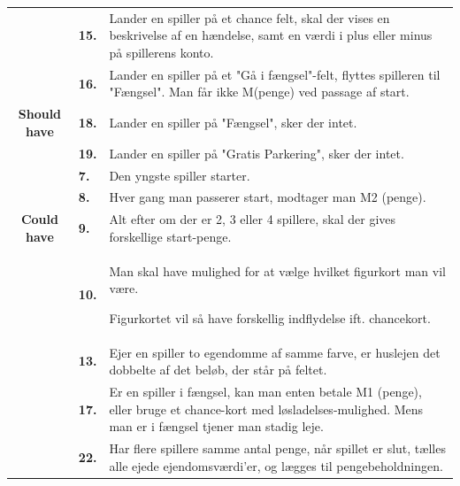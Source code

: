 \begin{center}
\begin{tabular}{ || c | l | p{11.5cm} ||}
     \cline{2-3}
     &
     \textbf{15.}
     &
     Lander en spiller på et chance felt, skal der vises en beskrivelse af en hændelse, samt en værdi i plus eller minus på spillerens konto.
     \\

     \cline{2-3}
     &
     \textbf{16.}
     &
     Lander en spiller på et "Gå i fængsel"-felt, flyttes spilleren til "Fængsel". Man får ikke M(penge) ved passage af start.
     \\
    
     \cline{2-3}
     \textbf{Should have}
     &
     \textbf{18.}
     &
     Lander en spiller på "Fængsel", sker der intet. \\
    
     \cline{2-3}
     &
     \textbf{19.}
     &
     Lander en spiller på "Gratis Parkering", sker der intet. 
     \\

     \hline
     \hline
     &
     \textbf{7.}
     &
     Den yngste spiller starter.
     \\

     \cline{2-3}
     &
     \textbf{8.}
     &
     Hver gang man passerer start, modtager man M2 (penge).
     \\
     
     \cline{2-3}
     \textbf{Could have}
     &
     \textbf{9.}
     &
     Alt efter om der er 2, 3 eller 4 spillere, skal der gives forskellige start-penge.
     \\

     \cline{2-3}
     &
     \textbf{10.}
     &
     Man skal have mulighed for at vælge hvilket figurkort man vil være.
     
     Figurkortet vil så have forskellig indflydelse ift. chancekort. 
     \\

     \cline{2-3}
     &
     \textbf{13.}
     &
     Ejer en spiller to egendomme af samme farve, er huslejen det dobbelte af det beløb, der står på feltet.
     \\

     \cline{2-3}
     &
     \textbf{17.}
     &
     Er en spiller i fængsel, kan man enten betale M1 (penge), eller bruge et chance-kort med løsladelses-mulighed. Mens man er i fængsel tjener man stadig leje. 
     \\

    \hline
    \hline
    &
    \textbf{22.}
    &
    Har flere spillere samme antal penge, når spillet er slut, tælles alle ejede ejendomsværdi'er, og lægges til pengebeholdningen. \\


\end{tabular}
\end{center}
